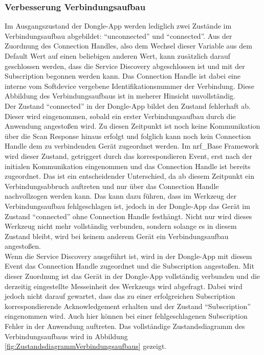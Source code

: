 \subsubsection{Verbesserung Verbindungsaufbau}
Im Ausgangszustand der Dongle-App werden lediglich zwei Zustände im Verbindungsaufbau abgebildet: ``unconnected'' und ``connected''. Aus der Zuordnung des Connection Handles, also dem Wechsel dieser Variable aus dem Default Wert auf einen beliebigen anderen Wert, kann zusätzlich darauf geschlossen werden, dass die Service Discovery abgeschlossen ist und mit der Subscription begonnen werden kann. Das Connection Handle ist dabei eine interne vom Softdevice vergebene Identifikationsnummer der Verbindung. Diese Abbildung des Verbindungsaufbaus ist in meherer Hinsicht unvollständig.\\
Der Zustand ``connected'' in der Dongle-App bildet den Zustand fehlerhaft ab. Dieser wird eingenommen, sobald ein erster Verbindungsaufbau durch die Anwendung angestoßen wird. Zu diesen Zeitpunkt ist noch keine Kommunikation über die Scan Response hinaus erfolgt und folglich kann noch kein Connection Handle dem zu verbindenden Gerät zugeordnet werden. Im nrf\_Base Framework wird dieser Zustand, getriggert durch das korrespondieren Event, erst nach der initialen Kommunikation eingenommen und das Connection Handle ist bereits zugeordnet. Das ist ein entscheidender Unterschied, da ab diesem Zeitpunkt ein Verbindungsabbruch auftreten und nur über das Connection Handle nachvollzogen werden kann. Das kann dazu führen, dass im Werkzeug der Verbindungsaufbau fehlgeschlagen ist, jedoch in der Dongle-App das Gerät im Zustand ``connected'' ohne Connection Handle festhängt. Nicht nur wird dieses Werkzeug nicht mehr vollständig verbunden, sondern solange es in diesem Zustand bleibt, wird bei keinem anderem Gerät ein Verbindungsaufbau angestoßen.\\
Wenn die Service Discovery ausgeführt ist, wird in der Dongle-App mit diesem Event das Connection Handle zugeordnet und die Subscription angestoßen. Mit dieser Zuordnung ist das Gerät in der Dongle-App vollständig verbunden und die derzeitig eingestellte Messeinheit des Werkzeugs wird abgefragt. Dabei wird jedoch nicht darauf gewartet, dass das zu einer erfolgreichen Subscription korrespondierende Acknowledgement erhalten und der Zustand ``Subscription'' eingenommen wird. Auch hier können bei einer fehlgeschlagenen Subscription Fehler in der Anwendung auftreten. Das vollständige Zustandsdiagramm des Verbindungsaufbaus wird in Abbildung \ref{fig:ZustandsdiagrammVerbindungsaufbaus} gezeigt.\\

